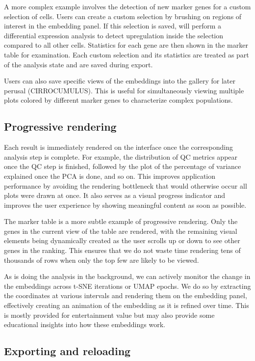 \documentclass{article}
\begin{document}
A more complex example involves the detection of new marker genes for a custom selection of cells.
Users can create a custom selection by brushing on regions of interest in the embedding panel.
If this selection is saved,  will perform a differential expression analysis to detect upregulation inside the selection compared to all other cells.
Statistics for each gene are then shown in the marker table for examination.
Each custom selection and its statistics are treated as part of the analysis state and are saved during export.

Users can also save specific views of the embeddings into the gallery for later perusal (CIRROCUMULUS).
This is useful for simultaneously viewing multiple plots colored by different marker genes to characterize complex populations.

\subsection{Progressive rendering}

Each result is immediately rendered on the interface once the corresponding analysis step is complete.
For example, the distribution of QC metrics appear once the QC step is finished, followed by the plot of the percentage of variance explained once the PCA is done, and so on.
This improves application performance by avoiding the rendering bottleneck that would otherwise occur all plots were drawn at once. 
It also serves as a visual progress indicator and improves the user experience by showing meaningful content as soon as possible.

The marker table is a more subtle example of progressive rendering.
Only the genes in the current view of the table are rendered, with the remaining visual elements being dynamically created as the user scrolls up or down to see other genes in the ranking.
This ensures that we do not waste time rendering tens of thousands of rows when only the top few are likely to be viewed.

As  is doing the analysis in the background, we can actively monitor the change in the embeddings across t-SNE iterations or UMAP epochs.
We do so by extracting the coordinates at various intervals and rendering them on the embedding panel,
effectively creating an animation of the embedding as it is refined over time.
This is mostly provided for entertainment value but may also provide some educational insights into how these embeddings work.

\subsection{Exporting and reloading}
\end{document}
